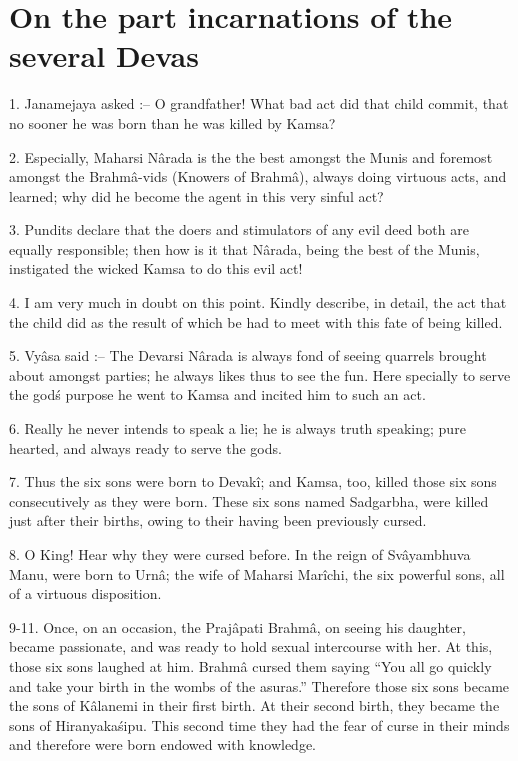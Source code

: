 ﻿\chapter{On the part incarnations of the several Devas}

1. Janamejaya asked :-- O grandfather! What bad act did that child commit, that no sooner he was born than he was killed by Kamsa?

2. Especially, Maharsi N\^arada is the the best amongst the Munis and foremost amongst the Brahm\^a-vids (Knowers of Brahm\^a), always doing virtuous acts, and learned; why did he become the agent in this very sinful act?

3. Pundits declare that the doers and stimulators of any evil deed both are equally responsible; then how is it that N\^arada, being the best of the Munis, instigated the wicked Kamsa to do this evil act!

4. I am very much in doubt on this point. Kindly describe, in detail, the act that the child did as the result of which be had to meet with this fate of being killed.

5. Vy\^asa said :-- The Devarsi N\^arada is always fond of seeing quarrels brought about amongst parties; he always likes thus to see the fun. Here specially to serve the god\'s purpose he went to Kamsa and incited him to such an act.

6. Really he never intends to speak a lie; he is always truth speaking; pure hearted, and always ready to serve the gods.

7. Thus the six sons were born to Devak\^i; and Kamsa, too, killed those six sons consecutively as they were born. These six sons named Sadgarbha, were killed just after their births, owing to their having been previously cursed.

8. O King! Hear why they were cursed before. In the reign of Sv\^ayambhuva Manu, were born to Urn\^a; the wife of Maharsi Mar\^ichi, the six powerful sons, all of a virtuous disposition.

9-11. Once, on an occasion, the Praj\^apati Brahm\^a, on seeing his daughter, became passionate, and was ready to hold sexual intercourse with her. At this, those six sons laughed at him. Brahm\^a cursed them saying ``You all go quickly and take your birth in the wombs of the asuras.'' Therefore those six sons became the sons of K\^alanemi in their first birth. At their second birth, they became the sons of Hiranyaka\'sipu. This second time they had the fear of curse in their minds and therefore were born endowed with knowledge.

